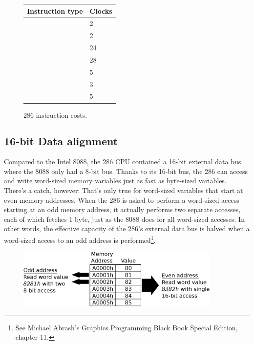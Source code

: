 \documentclass[book.tex]{subfiles}
\begin{document}
  \begin{figure}[H]
\centering  
\begin{tabularx}{\textwidth}{ X  Y }
  \toprule
  \textbf{Instruction type} &  \textbf{Clocks} \\
  \toprule 
    & 2  \\
    & 2  \\
    & 24  \\
    & 28 \\
    & 5 \\
    & 3 \\
    & 5 \\
  \toprule
\end{tabularx}
\caption{286 instruction costs\protect\footnotemark.}
\end{figure}
\addtocounter{footnote}{-1}


\subsection{16-bit Data alignment}
Compared to the Intel 8088, the 286 CPU contained a 16-bit external data bus where the 8088 only had a 8-bit bus. Thanks to its 16-bit bus, the 286 can access and write word-sized memory variables just as fast as byte-sized variables. There's a catch, however: That's only true for word-sized variables that start at even memory addresses. When the 286 is asked to perform a word-sized access starting at an odd memory address, it actually performs two separate accesses, each of which fetches 1 byte, just as the 8088 does for all word-sized accesses. In other words, the effective capacity of the 286's external data bus is halved when a word-sized access to an odd address is performed\footnote{See Michael Abrash's Graphics Programming Black Book Special Edition, chapter 11.}.\\

\begin{figure}[H]
\centering
\includegraphics[width=0.9\textwidth]{imgs/drawings/data_alignment.eps}\\
\end{figure}
\par
\end{document}
